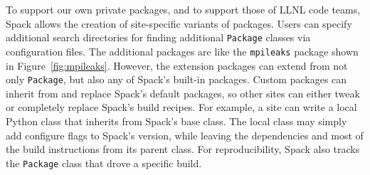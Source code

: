 To support our own private packages, and to support those of LLNL code teams,
Spack allows the creation of site-specific variants of packages.
Users can specify additional search directories for finding additional 
{\tt Package} classes via configuration files.
%
The additional packages are like the {\tt mpileaks} package shown in 
Figure~\ref{fig:mpileaks}.  However, the extension packages can extend from not
only {\tt Package}, but also any of Spack's built-in packages.
Custom packages can inherit from and replace Spack's default
packages, so other sites can either tweak or completely replace Spack's
build recipes. For example, a site can write a local Python class that 
inherits from Spack's base class. The local class may simply add configure 
flags to Spack's version, while leaving the dependencies and most of the 
build instructions from its parent class. For reproducibility, Spack also 
tracks the {\tt Package} class that drove a specific build.
